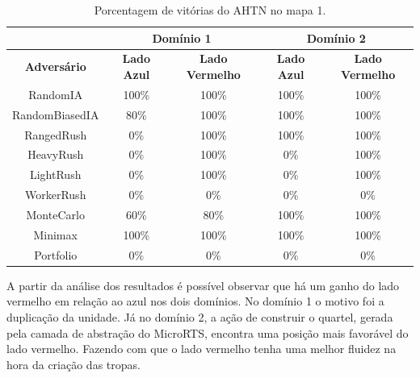 \begin{table}[ht]
	\centering
	\caption{Porcentagem de vitórias do AHTN no mapa 1.}
	\label{tab:mapa1}
	\begin{tabular}{|c|cc|cc|}
		\hline
		\textbf{}           & \multicolumn{2}{c|}{\textbf{Domínio 1}}  & \multicolumn{2}{c|}{\textbf{Domínio 2}}  \\ \hline
		\textbf{Adversário} & \textbf{Lado Azul} & \textbf{Lado Vermelho} & \textbf{Lado Azul} & \textbf{Lado Vermelho} \\ \hline
		RandomIA            & 100\%              & 100\%                  & 100\%              & 100\%                  \\ \hline
		RandomBiasedIA      & 80\%               & 100\%                  & 100\%              & 100\%                  \\ \hline
		RangedRush          & 0\%                & 100\%                  & 100\%              & 100\%                  \\ \hline
		HeavyRush           & 0\%                & 100\%                  & 0\%                & 100\%                  \\ \hline
		LightRush           & 0\%                & 100\%                  & 0\%                & 100\%                  \\ \hline
		WorkerRush          & 0\%                & 0\%                    & 0\%                & 0\%                    \\ \hline
		MonteCarlo          & 60\%               & 80\%                   & 100\%              & 100\%                  \\ \hline
		Minimax             & 100\%              & 100\%                  & 100\%              & 100\%                  \\ \hline
		Portfolio           & 0\%                & 0\%                    & 0\%                & 0\%                    \\ \hline
	\end{tabular}
\end{table}

A partir da análise dos resultados é possível observar que há um ganho do lado vermelho em relação ao azul nos dois domínios. 
No domínio 1 o motivo foi a duplicação da unidade.
Já no domínio 2, a ação de construir o quartel, gerada pela camada de abstração do MicroRTS, encontra uma posição mais favorável do lado vermelho.
Fazendo com que o lado vermelho tenha uma melhor fluidez na hora da criação das tropas.

